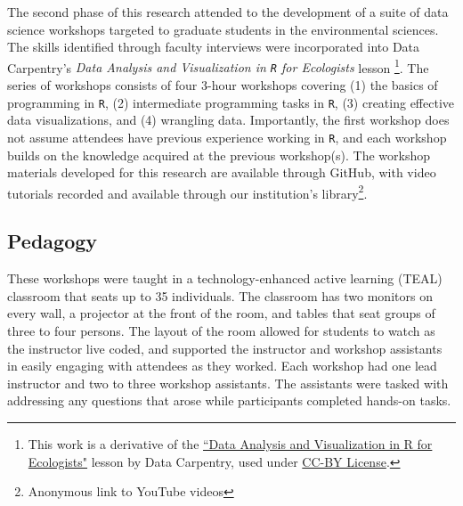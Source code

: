 \documentclass[12pt]{article}
\begin{document}
\noindent The second phase of this research attended to the  development of a 
suite of data science workshops targeted to graduate students in the 
environmental sciences. The skills identified through faculty interviews were
incorporated into Data Carpentry's \emph{Data Analysis and Visualization in 
\texttt{R} for Ecologists} lesson \citep{ecology_curriculum}\footnote{This
work is a derivative of the \href{https://datacarpentry.org/R-ecology-lesson}{``Data 
Analysis and Visualization in R for Ecologists"} lesson by Data Carpentry, used
under \href{https://creativecommons.org/licenses/by/4.0/}{CC-BY License}.}.
The series of workshops consists of four 3-hour workshops covering (1)
the basics of programming in \texttt{R}, (2) intermediate programming tasks in 
\texttt{R}, (3) creating effective data visualizations, and (4) wrangling data.
Importantly, the first workshop does not assume attendees have previous
experience working in \texttt{R}, and each workshop builds on the knowledge
acquired at the previous workshop(s). The workshop materials developed for this
research are available through GitHub, with video tutorials recorded and
available through our institution's library\footnote{Anonymous link to
YouTube videos}.




\subsection{Pedagogy}

\noindent These workshops were taught in a technology-enhanced active learning
(TEAL) classroom that seats up to 35 individuals. The classroom has two monitors
on every wall, a projector at the front of the room, and tables that seat groups
of three to four persons. The layout of the room allowed for students to
watch as the instructor live coded, and supported the instructor and workshop
assistants in easily engaging with attendees as they worked. Each workshop had
one lead instructor and two to three workshop assistants. The assistants were
tasked with addressing any questions that arose while participants completed 
hands-on tasks. 
\end{document}
